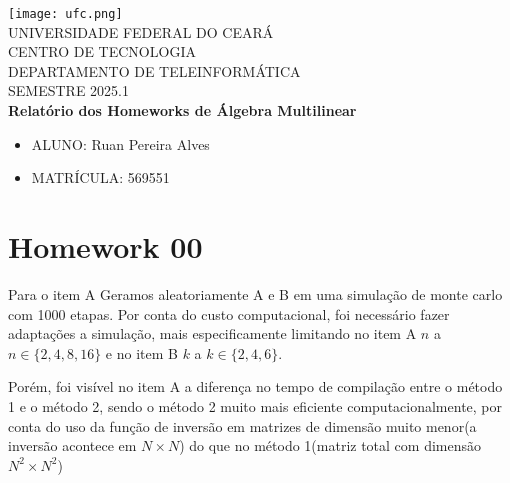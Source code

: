 


	
	\clearpage
	\thispagestyle{empty}
	
	\begin{bfseries}
		\begin{center}
			
			\texttt{[image: ufc.png]} \\
			\vspace{-4pt} 
			UNIVERSIDADE FEDERAL DO CEARÁ \\
			\vspace{4pt} 
			CENTRO DE TECNOLOGIA \\
			\vspace{4pt} 
			DEPARTAMENTO DE TELEINFORMÁTICA \\
			\vspace{4pt}
			\vspace{4pt}
			SEMESTRE 2025.1 \\
			
			
			\vspace*{\fill}
			\textbf{Relatório dos Homeworks de Álgebra Multilinear}
			\vspace*{\fill}
			
		\end{center}
		
		\begin{itemize}[leftmargin=*]
			\setlength{\itemsep}{0pt}
			\item[] ALUNO: Ruan Pereira Alves
			\item[] MATRÍCULA: 569551
		\end{itemize}
		
	\end{bfseries}
	\newpage
	
	\section{Homework 00}
	
	Para o item A
	Geramos aleatoriamente A e B em uma simulação de monte carlo com 1000 etapas. Por conta do custo computacional, foi necessário fazer adaptações a simulação, mais especificamente limitando no item A $n$ a $n \in \{2,4,8,16\}$ e no item B $k$ a $k \in \{2,4,6\}$.
	
	Porém, foi visível no item A a diferença no tempo de compilação entre o método 1 e o método 2, sendo o método 2 muito mais eficiente computacionalmente, por conta do uso da função de inversão em matrizes de dimensão muito menor(a inversão acontece em $N \times N$) do que no método 1(matriz total com dimensão $N^2 \times N^2$)
	
